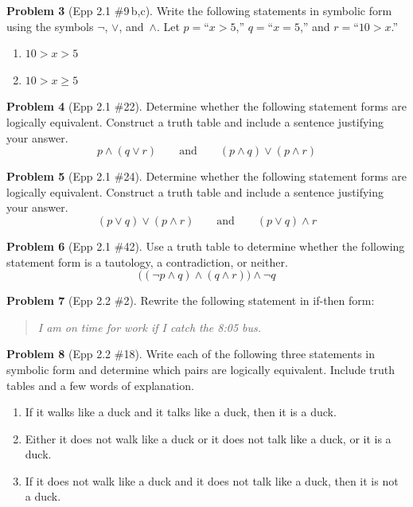 \documentclass[11pt]{article}
\begin{document}
\bigskip

\noindent\textbf{Problem 3} (Epp 2.1 \#9\,b,c). \;
Write the following statements in symbolic form using the
symbols $\lnot$, $\lor$, and~$\land$.  Let $p ={}$``$x > 5$,''
$q ={}$``$x = 5$,'' and $r ={}$``$10 > x$.''

\begin{enumerate}[label=\textbf{\alph*.},start=2,itemsep=4pt]
  \item $10 > x > 5$
  \setcounter{enumi}{2}
  \item $10 > x \ge 5$
\end{enumerate}

\bigskip

\noindent\textbf{Problem 4} (Epp 2.1 \#22). \;
Determine whether the following statement forms are logically
equivalent.  Construct a truth table and include a sentence
justifying your answer.
\[
  p \land (q \lor r)
  \qquad\text{and}\qquad
  (p \land q) \lor (p \land r)
\]

\bigskip

\noindent\textbf{Problem 5} (Epp 2.1 \#24). \;
Determine whether the following statement forms are logically
equivalent.  Construct a truth table and include a sentence
justifying your answer.
\[
  (p \lor q) \lor (p \land r)
  \qquad\text{and}\qquad
  (p \lor q) \land r
\]

\bigskip

\noindent\textbf{Problem 6} (Epp 2.1 \#42). \;
Use a truth table to determine whether the following statement
form is a tautology, a contradiction, or neither.
\[
  \bigl((\lnot p \land q) \land (q \land r)\bigr) \land \lnot q
\]

\bigskip

\noindent\textbf{Problem 7} (Epp 2.2 \#2). \;
Rewrite the following statement in if-then form:

\medskip
\begin{quote}
  \emph{I am on time for work if I catch the 8:05 bus.}
\end{quote}

\bigskip

\noindent\textbf{Problem 8} (Epp 2.2 \#18). \;
Write each of the following three statements in symbolic form
and determine which pairs are logically equivalent.  Include
truth tables and a few words of explanation.

\begin{enumerate}[label=(\roman*),itemsep=4pt]
  \item If it walks like a duck and it talks like a duck,
        then it is a duck.
  \item Either it does not walk like a duck or it does not talk
        like a duck, or it is a duck.
  \item If it does not walk like a duck and it does not talk like
        a duck, then it is not a duck.
\end{enumerate}
\end{document}
